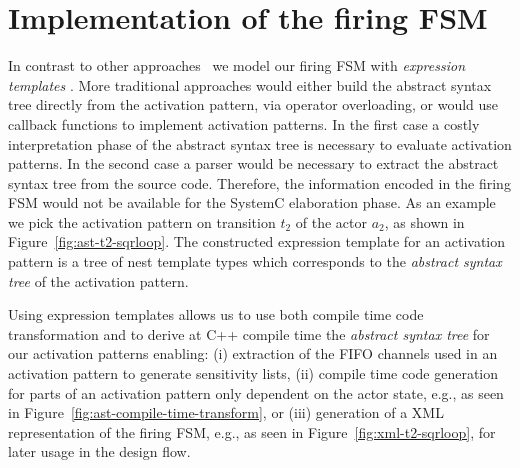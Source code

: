 \section{Implementation of the firing FSM}\label{sec:systemoc-implementation}

In contrast to other approaches~\cite{herrerasystemc:2004, PS:2005, PS:2004} we model our firing FSM with \emph{expression templates} \cite{veldhuizen:1995}.
More traditional approaches would either build the abstract syntax tree directly from the activation pattern, via operator overloading, or would use callback functions to implement activation patterns.
In the first case a costly interpretation phase of the abstract syntax tree is necessary to evaluate activation patterns.
In the second case a parser would be necessary to extract the abstract syntax tree from the source code.
Therefore, the information encoded in the firing FSM would not be available for the SystemC elaboration phase.
As an example we pick the activation pattern on transition $t_2$ of the  actor $a_2$, as shown in Figure~\ref{fig:ast-t2-sqrloop}.
The constructed expression template for an activation pattern is a tree of nest template types which corresponds to the \emph{abstract syntax tree} of the activation pattern.%


Using expression templates allows us to use both compile time code transformation and to derive at C++ compile time the \emph{abstract syntax tree} for our activation patterns enabling:
(i) extraction of the FIFO channels used in an activation pattern to generate sensitivity lists,
(ii) compile time code generation for parts of an activation pattern only dependent on the actor state, e.g., as seen in Figure~\ref{fig:ast-compile-time-transform}, or
(iii) generation of a XML representation of the firing FSM, e.g., as seen in Figure~\ref{fig:xml-t2-sqrloop}, for later usage in the design flow.

